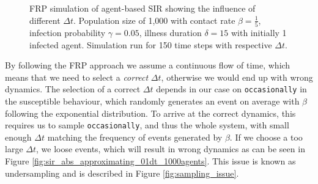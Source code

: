 \begin{figure}
\begin{center}
	\caption{FRP simulation of agent-based SIR showing the influence of different $\Delta t$. Population size of 1,000 with contact rate $\beta = \frac{1}{5}$, infection probability $\gamma = 0.05$, illness duration $\delta = 15$ with initially 1 infected agent. Simulation run for 150 time steps with respective $\Delta t$.} 
	\label{fig:sir_abs_dynamics_frp}
\end{center}
\end{figure}

By following the FRP approach we assume a continuous flow of time, which means that we need to select a \textit{correct} $\Delta t$, otherwise we would end up with wrong dynamics. The selection of a correct $\Delta t$ depends in our case on \texttt{occasionally} in the susceptible behaviour, which randomly generates an event on average with $\beta$ following the exponential distribution. To arrive at the correct dynamics, this requires us to sample \texttt{occasionally}, and thus the whole system, with small enough $\Delta t$ matching the frequency of events generated by $\beta$. If we choose a too large $\Delta t$, we loose events, which will result in wrong dynamics as can be seen in Figure \ref{fig:sir_abs_approximating_01dt_1000agents}. This issue is known as undersampling and is described in Figure \ref{fig:sampling_issue}.

